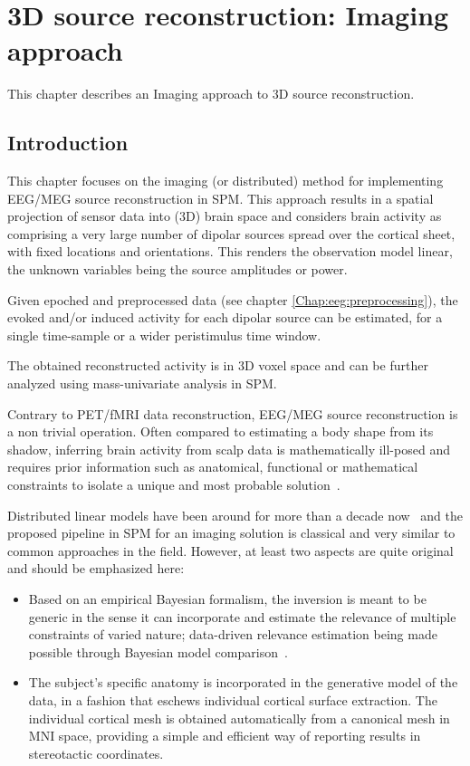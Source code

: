 \chapter{3D source reconstruction: Imaging approach \label{Chap:eeg:imaging}}

This chapter describes an Imaging approach to 3D source reconstruction.

\section{Introduction\label{sec:imaginv_intro}}
This chapter focuses on the imaging (or distributed) method for implementing EEG/MEG source reconstruction in SPM. This approach results in a spatial projection of sensor data into (3D) brain space and considers brain activity as comprising a very large number of dipolar sources spread over the cortical sheet, with fixed locations and orientations. This renders the observation model linear, the unknown variables being the source amplitudes or power.

Given epoched and preprocessed data (see chapter \ref{Chap:eeg:preprocessing}), the evoked and/or induced activity for each dipolar source can be estimated, for a single time-sample or a wider peristimulus time window.

The obtained reconstructed activity is in 3D voxel space and can be further analyzed using mass-univariate analysis in SPM.

Contrary to PET/fMRI data reconstruction, EEG/MEG source reconstruction is a non trivial operation. Often compared to estimating a body shape from its shadow, inferring brain activity from scalp data is mathematically ill-posed and requires prior information such as anatomical, functional or mathematical constraints to isolate a unique and most probable solution~\cite{Baillet01}.

Distributed linear models have been around for more than a decade now~\cite{Dale93} and the proposed pipeline in SPM for an imaging solution is classical and very similar to common approaches in the field. However, at least two aspects are quite original and should be emphasized here:

\begin{itemize}
\item Based on an empirical Bayesian formalism, the inversion is meant to be generic in the sense it can incorporate and estimate the relevance of multiple constraints of varied nature; data-driven relevance estimation being made possible through Bayesian model comparison~\cite{peb1,cp_empirical_eeg,jm_multiple,karl_induced}.
\item The subject's specific anatomy is incorporated in the generative model of the data, in a fashion that eschews individual cortical surface extraction. The individual cortical mesh is obtained automatically from a canonical mesh in MNI space, providing a simple and efficient way of reporting results in stereotactic coordinates.
\end{itemize}

